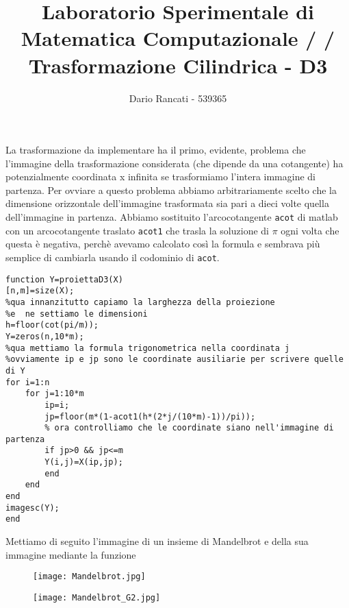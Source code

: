 \documentclass{article}
\title{\textbf{Laboratorio Sperimentale di Matematica Computazionale / / Trasformazione Cilindrica - D3}}
\author{Dario Rancati - 539365}
\begin{document}
\maketitle

\noindent
La trasformazione da implementare ha il primo, evidente, problema che l'immagine della trasformazione considerata (che dipende da una cotangente) ha potenzialmente coordinata x infinita se trasformiamo l'intera immagine di partenza. Per ovviare a questo problema abbiamo arbitrariamente scelto che la dimensione orizzontale dell'immagine trasformata sia pari a dieci volte quella dell'immagine in partenza. Abbiamo sostituito l'arcocotangente \texttt{acot} di matlab con un arcocotangente traslato \texttt{acot1} che trasla la soluzione di $\pi$ ogni volta che questa è negativa, perchè avevamo calcolato così la formula e sembrava più semplice di cambiarla usando il codominio di \texttt{acot}.

\begin{lstlisting}
function Y=proiettaD3(X)
[n,m]=size(X);
%qua innanzitutto capiamo la larghezza della proiezione
%e  ne settiamo le dimensioni
h=floor(cot(pi/m)); 
Y=zeros(n,10*m);
%qua mettiamo la formula trigonometrica nella coordinata j
%ovviamente ip e jp sono le coordinate ausiliarie per scrivere quelle di Y
for i=1:n
    for j=1:10*m
        ip=i;
        jp=floor(m*(1-acot1(h*(2*j/(10*m)-1))/pi));
        % ora controlliamo che le coordinate siano nell'immagine di partenza
        if jp>0 && jp<=m
        Y(i,j)=X(ip,jp);
        end
    end
end
imagesc(Y);
end
\end{lstlisting}

\noindent
Mettiamo di seguito l'immagine di un insieme di Mandelbrot e della sua immagine mediante la funzione

\begin{figure}[h!]
\centering
\texttt{[image: Mandelbrot.jpg]}
\end{figure}


\begin{figure}[h!]
\centering
\texttt{[image: Mandelbrot\_G2.jpg]}
\end{figure}
\end{document}
